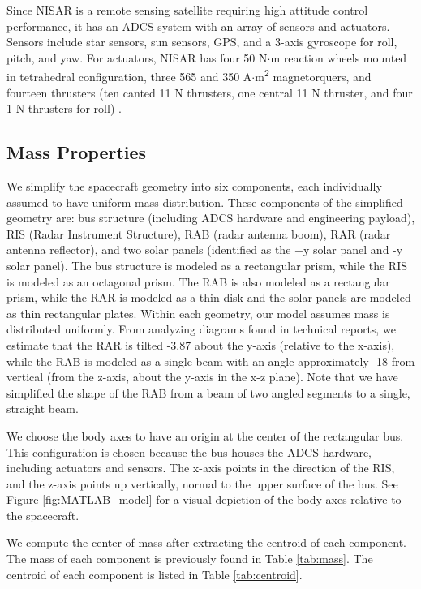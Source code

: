 Since NISAR is a remote sensing satellite requiring high attitude control performance, it has an ADCS system with an array of sensors and actuators. Sensors include star sensors, sun sensors, GPS, and a 3-axis gyroscope for roll, pitch, and yaw. For actuators, NISAR has four 50 N$\cdot$m reaction wheels mounted in tetrahedral configuration, three 565 and 350 A$\cdot$m\textsuperscript{2} magnetorquers, and fourteen thrusters (ten canted 11 N thrusters, one central 11 N thruster, and four 1 N thrusters for roll) \cite{NISARMission}.

\subsection{Mass Properties}
We simplify the spacecraft geometry into six components, each individually assumed to have uniform mass distribution. These components of the simplified geometry are: bus structure (including ADCS hardware and engineering payload), RIS (Radar Instrument Structure), RAB (radar antenna boom), RAR (radar antenna reflector), and two solar panels (identified as the +y solar panel and -y solar panel). The bus structure is modeled as a rectangular prism, while the RIS is modeled as an octagonal prism. The RAB is also modeled as a rectangular prism, while the RAR is modeled as a thin disk and the solar panels are modeled as thin rectangular plates. Within each geometry, our model assumes mass is distributed uniformly. From analyzing diagrams found in technical reports, we estimate that the RAR is tilted -3.87\degree{} about the y-axis (relative to the x-axis), while the RAB is modeled as a single beam with an angle approximately -18\degree{} from vertical (from the z-axis, about the y-axis in the x-z plane). Note that we have simplified the shape of the RAB from a beam of two angled segments to a single, straight beam.

We choose the body axes to have an origin at the center of the rectangular bus. This configuration is chosen because the bus houses the ADCS hardware, including actuators and sensors. The x-axis points in the direction of the RIS, and the z-axis points up vertically, normal to the upper surface of the bus. See Figure \ref{fig:MATLAB_model} for a visual depiction of the body axes relative to the spacecraft.

We compute the center of mass after extracting the centroid of each component. The mass of each component is previously found in Table \ref{tab:mass}. The centroid of each component is listed in Table \ref{tab:centroid}.

